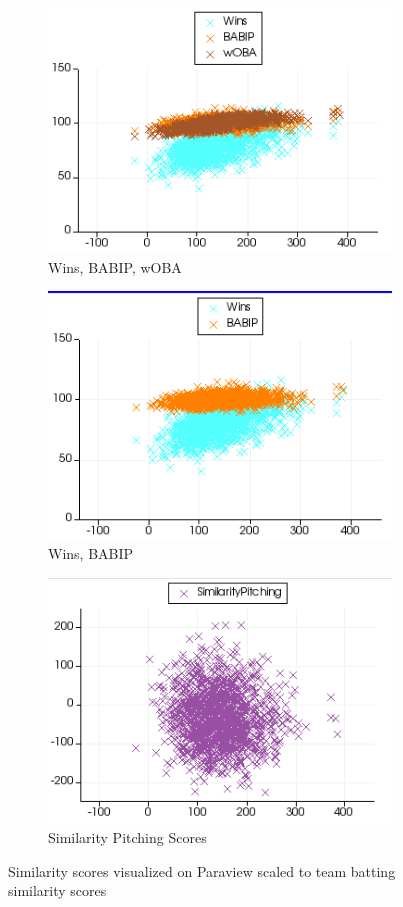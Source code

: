 \documentclass[12pt]{article}
\numberwithin{equation}{subsection}
\begin{document}
\begin{figure}[H] 
  \begin{subfigure}[b]{0.5\linewidth}
    \centering
    \includegraphics[width=0.9\linewidth]{similarhit1} 
    \caption{Wins, BABIP, wOBA} 
    \label{fig5:a} 
    \vspace{4ex}
  \end{subfigure}%
  \begin{subfigure}[b]{0.5\linewidth}
    \centering
    \includegraphics[width=0.9\linewidth]{similarhit2} 
    \caption{Wins, BABIP} 
    \label{fig5:b} 
    \vspace{4ex}
  \end{subfigure} 
  \begin{subfigure}[b]{\linewidth}
    \centering
    \includegraphics[width=0.6\linewidth]{similarhit4} 
    \caption{Similarity Pitching Scores} 
    \label{fig5:d} 
  \end{subfigure} 
  \caption{Similarity scores visualized on Paraview scaled to team batting similarity scores}
  \label{fig5} 
\end{figure}
\end{document}
